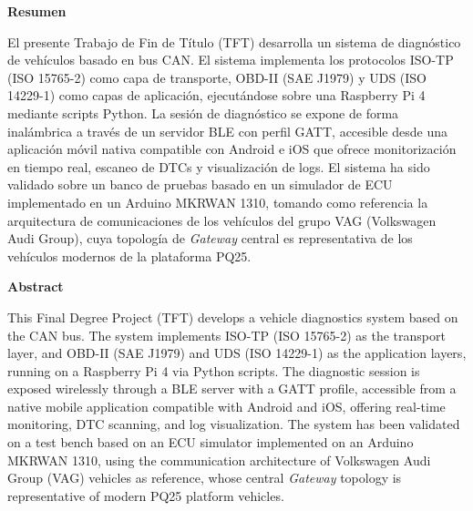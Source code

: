 {\setlength{\parskip}{8mm}
{\huge{\textbf{Resumen}}}

    {\large{El presente Trabajo de Fin de Título (TFT) desarrolla un sistema de diagnóstico de vehículos basado en bus CAN. El sistema implementa los protocolos ISO-TP (ISO 15765-2) como capa de transporte, OBD-II (SAE J1979) y UDS (ISO 14229-1) como capas de aplicación, ejecutándose sobre una Raspberry Pi 4 mediante scripts Python. La sesión de diagnóstico se expone de forma inalámbrica a través de un servidor BLE con perfil GATT, accesible desde una aplicación móvil nativa compatible con Android e iOS que ofrece monitorización en tiempo real, escaneo de DTCs y visualización de logs. El sistema ha sido validado sobre un banco de pruebas basado en un simulador de ECU implementado en un Arduino MKRWAN 1310, tomando como referencia la arquitectura de comunicaciones de los vehículos del grupo VAG (Volkswagen Audi Group), cuya topología de \textit{Gateway} central es representativa de los vehículos modernos de la plataforma PQ25.}}

\newpage

{\huge{\textbf{Abstract}}}

    {\large{This Final Degree Project (TFT) develops a vehicle diagnostics system based on the CAN bus. The system implements ISO-TP (ISO 15765-2) as the transport layer, and OBD-II (SAE J1979) and UDS (ISO 14229-1) as the application layers, running on a Raspberry Pi 4 via Python scripts. The diagnostic session is exposed wirelessly through a BLE server with a GATT profile, accessible from a native mobile application compatible with Android and iOS, offering real-time monitoring, DTC scanning, and log visualization. The system has been validated on a test bench based on an ECU simulator implemented on an Arduino MKRWAN 1310, using the communication architecture of Volkswagen Audi Group (VAG) vehicles as reference, whose central \textit{Gateway} topology is representative of modern PQ25 platform vehicles.}

}}
